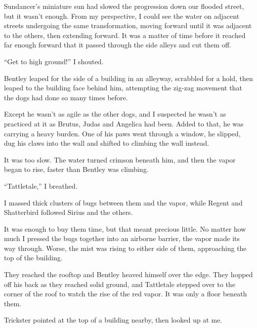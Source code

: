 Sundancer's miniature sun had slowed the progression down our flooded street, but it wasn't enough.  From my perspective, I could see the water on adjacent streets undergoing the same transformation, moving forward until it was adjacent to the others, then extending forward.  It was a matter of time before it reached far enough forward that it passed through the side alleys and cut them off.



``Get to high ground!''  I shouted.



Bentley leaped for the side of a building in an alleyway, scrabbled for a hold, then leaped to the building face behind him, attempting the zig-zag movement that the dogs had done so many times before.



Except he wasn't as agile as the other dogs, and I suspected he wasn't as practiced at it as Brutus, Judas and Angelica had been.  Added to that, he was carrying a heavy burden.  One of his paws went through a window, he slipped, dug his claws into the wall and shifted to climbing the wall instead.



It was too slow.  The water turned crimson beneath him, and then the vapor began to rise, faster than Bentley was climbing.



``Tattletale,'' I breathed.



I massed thick clusters of bugs between them and the vapor, while Regent and Shatterbird followed Sirius and the others.



It was enough to buy them time, but that meant precious little.  No matter how much I pressed the bugs together into an airborne barrier, the vapor made its way through.  Worse, the mist was rising to either side of them, approaching the top of the building.



They reached the rooftop and Bentley heaved himself over the edge.  They hopped off his back as they reached solid ground, and Tattletale stepped over to the corner of the roof to watch the rise of the red vapor.  It was only a floor beneath them.



Trickster pointed at the top of a building nearby, then looked up at me.



